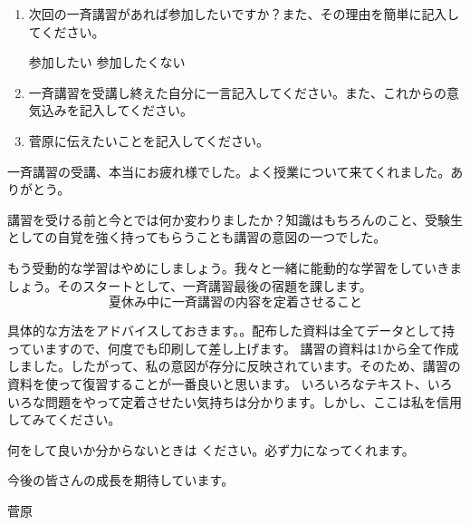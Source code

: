 \begin{enumerate}
  \item 次回の一斉講習があれば参加したいですか？また、その理由を簡単に記入してください。
    \begin{center}
      参加したい \qquad\qquad\qquad\qquad 参加したくない\\[1.5em]
    \sheetline[0.95\linewidth][2em]
    \end{center}

  \item 一斉講習を受講し終えた自分に一言記入してください。また、これからの意気込みを記入してください。
    \begin{center}
    \sheetline[0.95\linewidth][4em]
    \end{center}

  \item 菅原に伝えたいことを記入してください。
    \begin{center}
    \sheetline[0.95\linewidth][8em]
    \end{center}
  \end{enumerate}
  \vspace{1.5em}

  \begingroup
  \setlength{\parindent}{1zw}
  \setlength{\parskip}{0pt}

  \indent 一斉講習の受講、本当にお疲れ様でした。よく授業について来てくれました。ありがとう。

  講習を受ける前と今とでは何か変わりましたか？知識はもちろんのこと、受験生としての自覚を強く持ってもらうことも講習の意図の一つでした。

  もう受動的な学習はやめにしましょう。我々と一緒に能動的な学習をしていきましょう。そのスタートとして、一斉講習最後の宿題を課します。
  \[\textbf{夏休み中に一斉講習の内容を定着させること}\]

  具体的な方法をアドバイスしておきます。。配布した資料は全てデータとして持っていますので、何度でも印刷して差し上げます。
  講習の資料は1から全て作成しました。したがって、私の意図が存分に反映されています。そのため、講習の資料を使って復習することが一番良いと思います。
  いろいろなテキスト、いろいろな問題をやって定着させたい気持ちは分かります。しかし、ここは私を信用してみてください。

  何をして良いか分からないときは  ください。必ず力になってくれます。

  今後の皆さんの成長を期待しています。
  
  \begin{flushright}
  菅原
  \end{flushright}

  \endgroup
